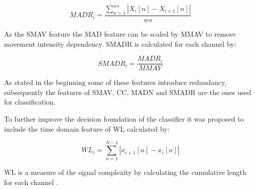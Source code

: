 \begin{equation} \label{eq:MADR}
MADR_i=\frac{\sum_{n=1}^{ws}|X_i[n]-X_{i+1}[n]|}{ws}
\end{equation}

As the SMAV feature the MAD feature can be scaled by MMAV to remove movement intensity dependency. SMADR is calculated for each channel by:

\begin{equation} \label{eq:MMADR}
SMADR_i=\frac{MADR_i}{MMAV}
\end{equation}


As stated in the beginning some of these features introduce redundancy, subsequently the features of SMAV, CC, MADN and SMADR are the ones used for classification. \cite{Donovan2017}

To further improve the decision foundation of the classifier it was proposed to include the time domain feature of WL calculated by: 

\begin{equation} \label{eq:WL}
WL_i=\sum_{n=1}^{N-1}|x_{i+1}[n]-x_i[n]|
\end{equation}

WL is a measure of the signal complexity by calculating the cumulative length for each channel \cite{Phiny2012}.

